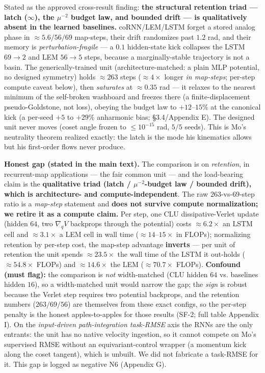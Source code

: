 \documentclass[10pt]{article}
\begin{document}
Stated as the approved cross-result finding: \textbf{the structural retention triad --- latch ($\infty$), the $\mu^{-2}$ budget law, and bounded drift --- is qualitatively absent in the learned baselines.} coRNN/LEM/LSTM forget a stored analog phase in $\approx5.6/56/69$ map-steps, their drift randomizes past $1.2$ rad, and their memory is \emph{perturbation-fragile} --- a $0.1$ hidden-state kick collapses the LSTM $69\to2$ and LEM $56\to5$ steps, because a marginally-stable trajectory is not a basin. The generically-trained unit (architecture-matched: a plain MLP potential, no designed symmetry) holds $\approx263$ steps ($\approx4\times$ longer \emph{in map-steps}; per-step compute caveat below), then \emph{saturates} at $\approx0.35$ rad --- it relaxes to the nearest minimum of the self-broken washboard and freezes there (a finite-displacement pseudo-Goldstone, not loss), obeying the budget law to $+12$--$15\%$ at the canonical kick (a per-seed $+5$ to $+29\%$ anharmonic bias; \S3.4/Appendix E). The designed unit never moves (coset angle frozen to $\le10^{-15}$ rad, $5/5$ seeds). This is Mo's neutrality theorem realized exactly: the latch is the mode his kinematics allows but his first-order flows never produce.

\textbf{Honest gap (stated in the main text).} The comparison is on \emph{retention}, in recurrent-map applications --- the fair common unit --- and the load-bearing claim is the \textbf{qualitative triad (latch / $\mu^{-2}$-budget law / bounded drift), which is architecture- and compute-independent}. The raw $263$-vs-$69$-step ratio is a \emph{map-step} statement and \textbf{does not survive compute normalization; we retire it as a compute claim.} Per step, one CLU dissipative-Verlet update (hidden $64$, two $\nabla_qV$ backprops through the potential) costs $\approx6.2\times$ an LSTM cell and $\approx3.1\times$ a LEM cell in wall time ($\approx14$--$15\times$ in FLOPs); normalizing retention by per-step cost, the map-step advantage \textbf{inverts} --- per unit of retention the unit spends $\approx23.5\times$ the wall time of the LSTM it out-holds ($\approx54.8\times$ FLOPs) and $\approx14.6\times$ the LEM ($\approx70.7\times$ FLOPs). \textbf{Confound (must flag):} the comparison is \emph{not} width-matched (CLU hidden $64$ vs. baselines hidden $16$), so a width-matched unit would narrow the gap; the \emph{sign} is robust because the Verlet step requires two potential backprops, and the retention numbers ($263/69/56$) are themselves from these exact configs, so the per-step penalty is the honest apples-to-apples for those results (SF-2; full table Appendix I). On the \emph{input-driven path-integration task-RMSE} axis the RNNs are the only entrants: the unit has no native velocity ingestion, so it cannot compete on Mo's supervised RMSE without an equivariant-control wrapper (a momentum kick along the coset tangent), which is unbuilt. We did not fabricate a task-RMSE for it. This gap is logged as negative N6 (Appendix G).
\end{document}
